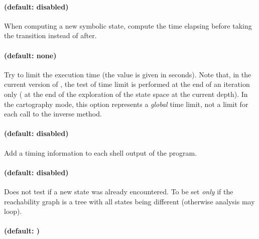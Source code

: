 \paragraph{ (default: disabled)}
When computing a new symbolic state, compute the time elapsing before taking the transition instead of after.




\paragraph{ (default: none)}
Try to limit the execution time (the value  is given in seconds).
Note that, in the current version of \imitator{}, the test of time limit is performed at the end of an iteration only (\ie{} at the end of the exploration of the state space at the current depth).
In the cartography mode, this option represents a \emph{global} time limit, not a limit for each call to the inverse method.


\paragraph{ (default: disabled)}
Add a timing information to each shell output of the program.



\paragraph{ (default: disabled)}
Does not test if a new state was already encountered.
To be set \emph{only} if the reachability graph is a tree with all states being different (otherwise analysis may loop).




\paragraph{ (default: )}

